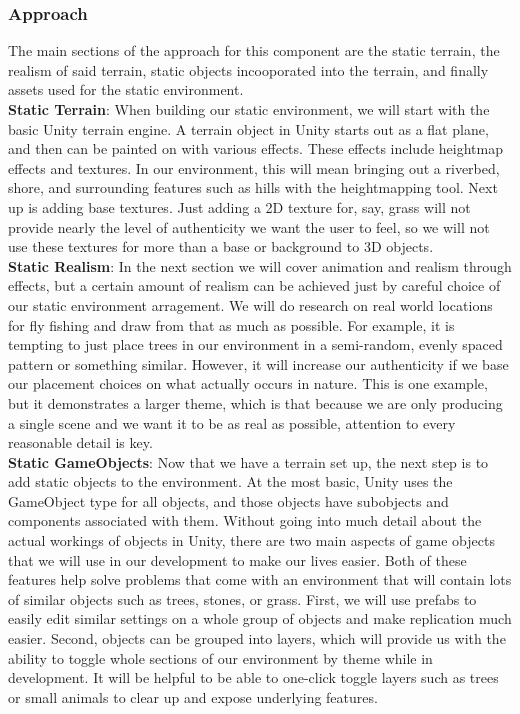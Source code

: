 \documentclass[10pt,journal,compsoc,onecolumn, draftclsnofoot]{IEEEtran}
\begin{document}
\subsubsection{Approach}
The main sections of the approach for this component are the static terrain, the realism of said terrain, static objects incooporated into the terrain, and finally assets used for the static environment.\\

\hangindent=0.5cm \textbf{Static Terrain}: When building our static environment, we
will start with the basic Unity terrain engine. A terrain object in Unity starts out
as a flat plane, and then can be painted on with various
effects.\cite{unity_man_terrain} These effects include heightmap effects and
textures. In our environment, this will mean bringing out a riverbed, shore, and
surrounding features such as hills with the heightmapping tool. Next up is adding
base textures. Just adding a 2D texture for, say, grass will not provide nearly the
level of authenticity we want the user to feel, so we will not use these textures
for more than a base or background to 3D objects.\\

\hangindent=0.5cm \textbf{Static Realism}: In the next section we will cover
animation and realism through effects, but a certain amount of realism can be
achieved just by careful choice of our static environment arragement. We will do
research on real world locations for fly fishing and draw from that as much as
possible. For example, it is tempting to just place trees in our environment in a
semi-random, evenly spaced pattern or something similar. However, it will increase
our authenticity if we base our placement choices on what actually occurs in nature.
This is one example, but it demonstrates a larger theme, which is that because we
are only producing a single scene and we want it to be as real as possible,
attention to every reasonable detail is key.\\

\hangindent=0.5cm \textbf{Static GameObjects}: Now that we have a terrain set up,
the next step is to add static objects to the environment. At the most basic, Unity
uses the GameObject type for all objects, and those objects have subobjects and
components associated with them. \cite{ray} Without going into much detail about the
actual workings of objects in Unity, there are two main aspects of game objects that
we will use in our development to make our lives easier. Both of these features help
solve problems that come with an environment that will contain lots of similar
objects such as trees, stones, or grass. First, we will use prefabs to easily
edit similar settings on a whole group of objects and make replication much
easier. \cite{ray} Second, objects can be grouped into layers, which will
provide us with the ability to toggle whole sections of our environment by
theme while in development. \cite{layers_video} It will be helpful to be able
to one-click toggle layers such as trees or small animals to clear up and
expose underlying features.\\
\end{document}
